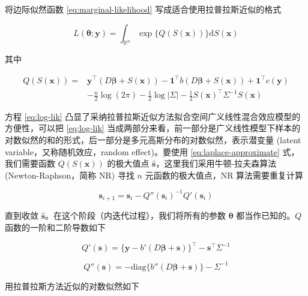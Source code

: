 \documentclass[12pt,a4paper,UTF8,twoside]{book}
\theoremstyle{definition}
\theoremstyle{definition}
\theoremstyle{definition}
\theoremstyle{remark}
\begin{document}
将边际似然函数 \eqref{eq:marginal-likelihood}
写成适合使用拉普拉斯近似的格式

\begin{equation}
L(\boldsymbol{\theta};\mathbf{y}) = \int_{\mathbb{R}^n} \exp\{Q(S(\mathbf{x}))\} \mathrm{d}S(\mathbf{x}) 
\end{equation}

其中

\begin{equation}
\begin{aligned}
Q(S(\mathbf{x})) ={} &  \mathbf{y}^{\top} (D \boldsymbol{\beta} + S(\mathbf{x})) - \mathbf{1}^{\top} b(D \boldsymbol{\beta} + S(\mathbf{x})) + \mathbf{1}^{\top}c(\mathbf{y}) \\
                   & - \frac{n}{2}\log (2\pi) -\frac{1}{2}\log |\Sigma| -\frac{1}{2}S(\mathbf{x})^{\top} \Sigma^{-1} S(\mathbf{x})
\end{aligned} \label{eq:log-lik}
\end{equation}

方程 \eqref{eq:log-lik}
凸显了采纳拉普拉斯近似方法拟合空间广义线性混合效应模型的方便性，可以把
\eqref{eq:log-lik}
当成两部分来看，前一部分是广义线性模型下样本的对数似然的和的形式，后一部分是多元高斯分布的对数似然，表示潜变量
(latent variable，又称随机效应，random effect)。要使用
\eqref{eq:laplace-approximate} 式，我们需要函数 \(Q(S(\mathbf{x}))\)
的极大值点 \(\hat{\mathbf{s}}\)，这里我们采用牛顿-拉夫森算法
(Newton-Raphson，简称 NR) 寻找 \(n\) 元函数的极大值点，NR
算法需要重复计算

\begin{equation}
\mathbf{s}_{i+1} = \mathbf{s}_{i} - Q''(\mathbf{s}_{i})^{-1}Q'(\mathbf{s}_{i}) 
\end{equation}

直到收敛
\(\hat{\mathbf{s}}\)。在这个阶段（内迭代过程），我们将所有的参数
\(\boldsymbol{\theta}\) 都当作已知的。\(Q\) 函数的一阶和二阶导数如下

\begin{equation}
Q'(\mathbf{s}) = \{\mathbf{y} - b'(D\boldsymbol{\beta} + \mathbf{s}) \}^{\top} - \mathbf{s}^{\top}\Sigma^{-1} \label{eq:first-deriv}
\end{equation}

\begin{equation}
Q''(\mathbf{s}) =  -\mathrm{diag} \{b''(D\boldsymbol{\beta} + \mathbf{s}) \} - \Sigma^{-1} \label{eq:second-deriv}
\end{equation}

用拉普拉斯方法近似的对数似然如下
\end{document}
